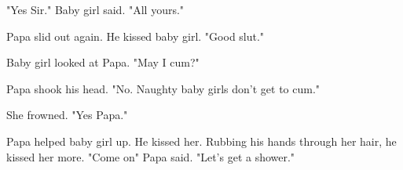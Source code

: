      "Yes Sir." Baby girl said. "All yours."

     Papa slid out again. He kissed baby girl. "Good slut."

     Baby girl looked at Papa. "May I cum?"

     Papa shook his head. "No. Naughty baby girls don't get to cum."

     She frowned. "Yes Papa."

     Papa helped baby girl up. He kissed her. Rubbing his hands through her hair, he kissed her more. "Come on" Papa said. "Let's get a shower."


